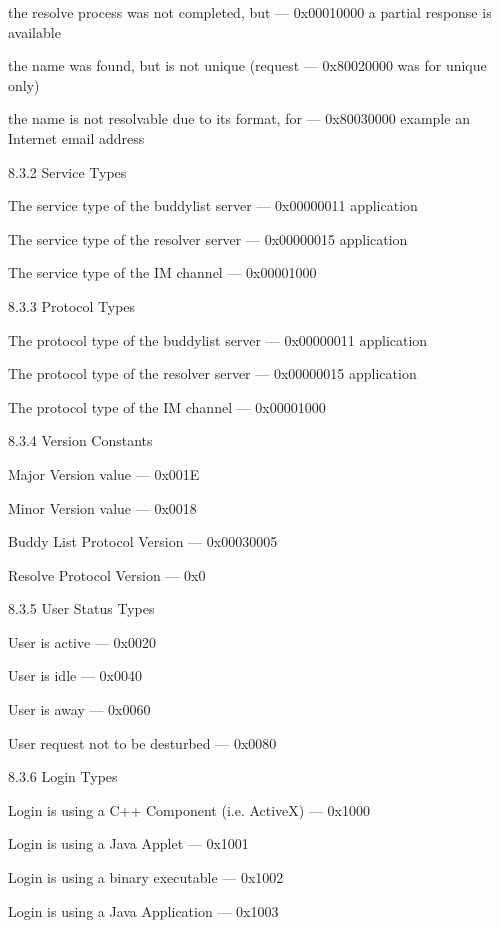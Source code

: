 \documentclass[titlepage,oneside]{book}
\begin{document}
the resolve process was not completed, but        --- 0x00010000
a partial response is available

the name was found, but is not unique (request    --- 0x80020000
was for unique only)

the name is not resolvable due to its format, for --- 0x80030000
example an Internet email address

8.3.2 Service Types

The service type of the buddylist server          --- 0x00000011
application

The service type of the resolver server           --- 0x00000015
application

The service type of the IM channel                --- 0x00001000

8.3.3 Protocol Types

The protocol type of the buddylist server         --- 0x00000011
application

The protocol type of the resolver server          --- 0x00000015
application

The protocol type of the IM channel               --- 0x00001000

8.3.4 Version Constants

Major Version value                               --- 0x001E

Minor Version value                               --- 0x0018

Buddy List Protocol Version                          --- 0x00030005

Resolve Protocol Version                          --- 0x0

8.3.5 User Status Types

User is active                                    --- 0x0020

User is idle                                      --- 0x0040

User is away                                      --- 0x0060

User request not to be desturbed                  --- 0x0080

8.3.6 Login Types

Login is using a C++ Component (i.e. ActiveX)     --- 0x1000

Login is using a Java Applet                      --- 0x1001

Login is using a binary executable                --- 0x1002

Login is using a Java Application                 --- 0x1003
\end{document}
